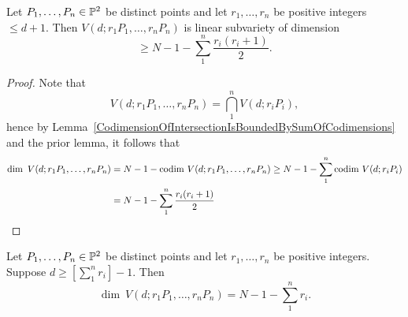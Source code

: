    \begin{lemma}\label{LowerBoundForLinearSystemsThroughPointsOfDiffMultiplicities}
        Let $P_1,\dots, P_n\in \mathbb{P}^2$ be distinct points and let $r_1,\dots,r_n$ be positive integers $\leq d+1$. Then $V(d; r_1P_1,\dots,r_nP_n)$ is linear subvariety of dimension 
        $$\geq N-1 -\sum_1^n \frac{r_i(r_i+1)}{2}.$$
    \end{lemma}
    \begin{proof}
        Note that 
        $$V(d; r_1P_1,\dots,r_nP_n)= \bigcap_1^n V(d;r_iP_i),$$
        hence by Lemma~\ref{CodimensionOfIntersectionIsBoundedBySumOfCodimensions} and the prior lemma, it follows that 
        \begin{align*} 
            \dim \ V(d;r_1P_1,\dots,r_nP_n) &= N-1-\codim\ V(d;r_1P_1,\dots,r_nP_n) \geq N-1-\sum_1^n \codim\ V(d;r_iP_i)\\
            &= N-1-\sum_1^n \frac{r_i(r_i+1)}{2} 
        \end{align*}
    \end{proof}
    \begin{theorem}
        Let $P_1,\dots, P_n\in \mathbb{P}^2$ be distinct points and let $r_1,\dots,r_n$ be positive integers. Suppose $d\geq \left[\sum_1^n r_i\right] - 1$. Then 
        $$\dim \ V(d; r_1P_1,\dots,r_nP_n) = N-1-\sum_1^n r_i.$$
    \end{theorem}
